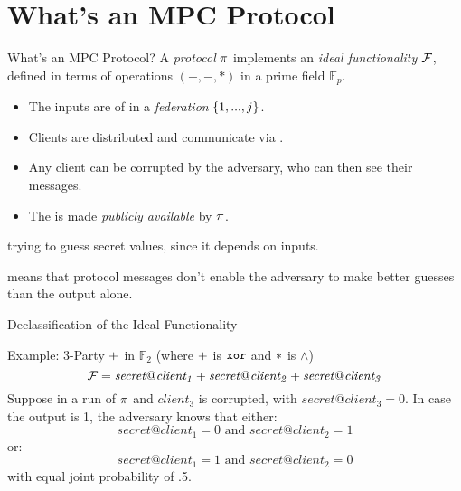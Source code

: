 \documentclass{beamer}
\begin{document}
\section{What's an MPC Protocol}

\begin{frame}{What's an MPC Protocol?}
  A \emph{protocol} $\pi$ implements an \emph{ideal functionality} $\mathcal{F}$,
  defined in terms of operations $(+,-,*)$ in a prime field $\mathbb{F}_p$.
  \begin{itemize}
  \item The inputs are  of  in a \emph{federation}
    $\{ 1,...,j \}$.
  \item Clients are distributed and communicate via .
  \item Any client can be corrupted by the adversary, who can then see their messages.
  \item The  is made \emph{publicly available} by $\pi$.
  \end{itemize}
   trying to
  guess secret values, since it depends on inputs.

  \medskip
  
   means that protocol messages don't enable the adversary
  to make better guesses than the output alone. 

\end{frame}

\begin{frame}{Declassification of the Ideal Functionality}

  \begin{exampleblock}{Example: 3-Party $+$ in $\mathbb{F}_2$ (where $+$ is $\texttt{xor}$ and $*$ is $\wedge$)}
  $$
    \mathcal{F} =
    \mathit{secret}@{\mathit{client_1}} + \mathit{secret}@{\mathit{client_2}} + 
      \mathit{secret}@{\mathit{client_3}}
  $$
  Suppose in a run of $\pi$ and $\mathit{client_3}$ is
  corrupted, with $\mathit{secret}@{\mathit{client_3}} = 0$. 
  In case the output is 1, the adversary knows that either:
  $$
  \mathit{secret}@{\mathit{client_1}} = 0 \text{\ and\ } \mathit{secret}@{\mathit{client_2}} = 1
  $$
  or:
  $$
  \mathit{secret}@{\mathit{client_1}} = 1 \text{\ and\ } \mathit{secret}@{\mathit{client_2}} = 0
  $$
  with equal joint probability of .5.

  \medskip

  \end{exampleblock}

\end{frame}  
\end{document}
